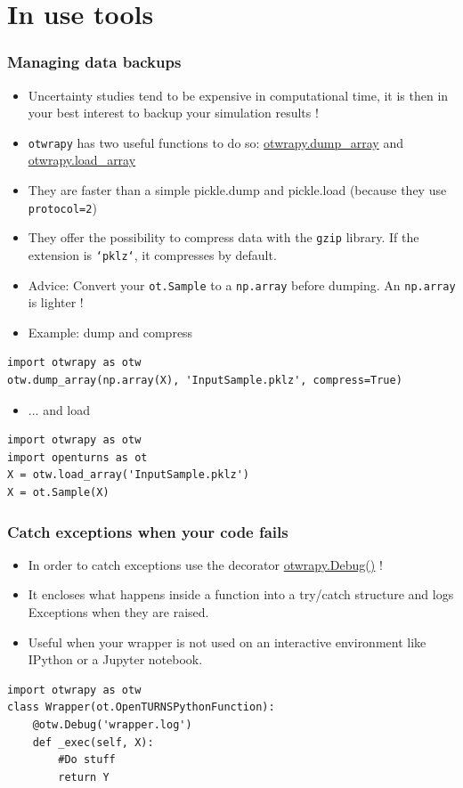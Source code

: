 \documentclass[10pt, aspectratio=169]{beamer}
\begin{document}
\section{In use tools}
\label{sec-4}
\begin{frame}[fragile]
\frametitle{Managing data backups}
\begin{itemize}
\item Uncertainty studies tend to be expensive in computational time, it is then in your best interest to backup your simulation results !
\item \texttt{otwrapy} has two useful functions to do so:  \href{http://openturns.github.io/otwrapy/master/_generated/otwrapy.dump_array.html}{otwrapy.dump\_array} and  \href{http://openturns.github.io/otwrapy/master/_generated/otwrapy.load_array.html}{otwrapy.load\_array}
\item They are faster than a simple pickle.dump and pickle.load (because they use \texttt{protocol=2})
\item They offer the possibility to compress data with the \texttt{gzip} library. If the extension is \texttt{`pklz`}, it compresses by default.
\item Advice: Convert your \texttt{ot.Sample} to a \texttt{np.array} before dumping. An \texttt{np.array} is lighter !
\item Example: dump and compress
\end{itemize}
\begin{Verbatim}[xleftmargin=10mm]
import otwrapy as otw
otw.dump_array(np.array(X), 'InputSample.pklz', compress=True)
\end{Verbatim}

\begin{itemize}
\item ... and load
\end{itemize}
\begin{Verbatim}[xleftmargin=10mm]
import otwrapy as otw
import openturns as ot
X = otw.load_array('InputSample.pklz')
X = ot.Sample(X)
\end{Verbatim}
\end{frame}

\begin{frame}[fragile]
\frametitle{Catch exceptions when your code fails}
\begin{itemize}
\item In order to catch exceptions use the decorator \href{http://openturns.github.io/otwrapy/master/_generated/otwrapy.Debug.html}{otwrapy.Debug()} !
\item It encloses what happens inside a function into a try/catch
  structure and logs Exceptions when they are raised.
\item Useful when your wrapper is not used on an interactive
  environment like IPython or a Jupyter notebook.
\end{itemize}
\begin{Verbatim}[xleftmargin=10mm]
import otwrapy as otw
class Wrapper(ot.OpenTURNSPythonFunction):
    @otw.Debug('wrapper.log')
    def _exec(self, X):
        #Do stuff
        return Y
\end{Verbatim}
\end{frame}
\end{document}

